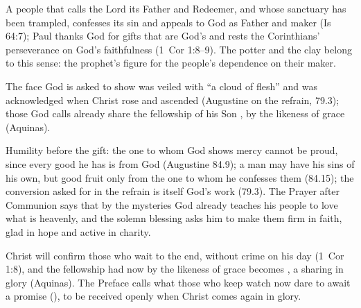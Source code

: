 \begin{fourSenses}
\item[Literal.] A people that calls the Lord its Father and Redeemer, and
whose sanctuary has been trampled, confesses its sin and appeals to God as
Father and maker (Is 64:7); Paul thanks God for gifts that are God's and
rests the Corinthians' perseverance on God's faithfulness (1~Cor 1:8--9).
The potter and the clay belong to this sense: the prophet's figure for the
people's dependence on their maker.
\item[Allegorical.] The face God is asked to show was veiled with ``a cloud
of flesh'' and was acknowledged when Christ rose and ascended (Augustine on
the refrain, 79.3); those God calls already share the fellowship of his Son
, by the likeness of grace (Aquinas).
\item[Moral.] Humility before the gift: the one to whom God shows mercy
cannot be proud, since every good he has is from God (Augustine 84.9); a man
may have his sins of his own, but good fruit only from the one to whom he
confesses them (84.15); the conversion asked for in the refrain is itself
God's work (79.3). The Prayer after Communion says that by the mysteries God
already teaches his people to love what is heavenly, and the solemn blessing
asks him to make them firm in faith, glad in hope and active in charity.
\item[Anagogical.] Christ will confirm those who wait to the end, without crime
on his day (1~Cor 1:8), and the fellowship had now by the likeness of grace
becomes , a sharing in glory (Aquinas). The
Preface calls what those who keep watch now dare to await a promise
(), to be received openly when Christ comes again in glory.
\end{fourSenses}
